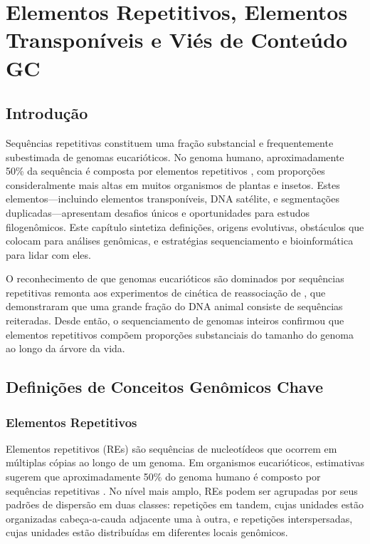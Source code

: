 
\chapter{Elementos Repetitivos, Elementos Transponíveis e Viés de Conteúdo GC}

\section{Introdução}

Sequências repetitivas constituem uma fração substancial e frequentemente subestimada de genomas eucarióticos. No genoma humano, aproximadamente 50\% da sequência é composta por elementos repetitivos \parencite{lander2001,dekonig2011}, com proporções consideralmente mais altas em muitos organismos de plantas e insetos. Estes elementos---incluindo elementos transponíveis, DNA satélite, e segmentações duplicadas---apresentam desafios únicos e oportunidades para estudos filogenômicos. Este capítulo sintetiza definições, origens evolutivas, obstáculos que colocam para análises genômicas, e estratégias sequenciamento e bioinformática para lidar com eles.

O reconhecimento de que genomas eucarióticos são dominados por sequências repetitivas remonta aos experimentos de cinética de reassociação de \textcite{britten1968}, que demonstraram que uma grande fração do DNA animal consiste de sequências reiteradas. Desde então, o sequenciamento de genomas inteiros confirmou que elementos repetitivos compõem proporções substanciais do tamanho do genoma ao longo da árvore da vida.

\section{Definições de Conceitos Genômicos Chave}

\subsection{Elementos Repetitivos}

Elementos repetitivos (REs) são sequências de nucleotídeos que ocorrem em múltiplas cópias ao longo de um genoma. Em organismos eucarióticos, estimativas sugerem que aproximadamente 50\% do genoma humano é composto por sequências repetitivas \parencite{haubold2006}. No nível mais amplo, REs podem ser agrupadas por seus padrões de dispersão em duas classes: repetições em tandem, cujas unidades estão organizadas cabeça-a-cauda adjacente uma à outra, e repetições interspersadas, cujas unidades estão distribuídas em diferentes locais genômicos.

